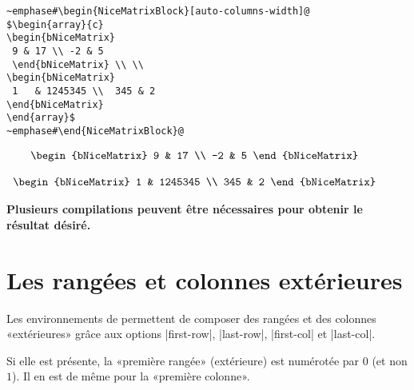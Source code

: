 \documentclass[dvipsnames]{article}%
\begin{document}
\medskip
\begin{BVerbatim}[baseline=c,boxwidth=8.5cm]
~emphase#\begin{NiceMatrixBlock}[auto-columns-width]@
$\begin{array}{c}
\begin{bNiceMatrix}
 9 & 17 \\ -2 & 5 
 \end{bNiceMatrix} \\ \\
\begin{bNiceMatrix}
 1   & 1245345 \\  345 & 2 
\end{bNiceMatrix}
\end{array}$
~emphase#\end{NiceMatrixBlock}@
\end{BVerbatim}
\begin{NiceMatrixBlock}
$\begin{array}{c}
\begin{bNiceMatrix}
 9 & 17 \\ -2 & 5 
 \end{bNiceMatrix} \\ \\
\begin{bNiceMatrix}
 1   & 1245345 \\  345 & 2 
\end{bNiceMatrix}
\end{array}$
\end{NiceMatrixBlock}

\medskip
\textbf{Plusieurs compilations peuvent être nécessaires pour obtenir le résultat désiré.} 



\bigskip
\section{Les rangées et colonnes extérieures}
Les environnements de  permettent de composer des rangées et des
colonnes «extérieures» grâce aux options |first-row|, |last-row|, |first-col| et
|last-col|.
\label{exterior}

Si elle est présente, la «première rangée» (extérieure) est numérotée par $0$
(et non $1$). Il en est de même pour la «première colonne».
\end{document}
